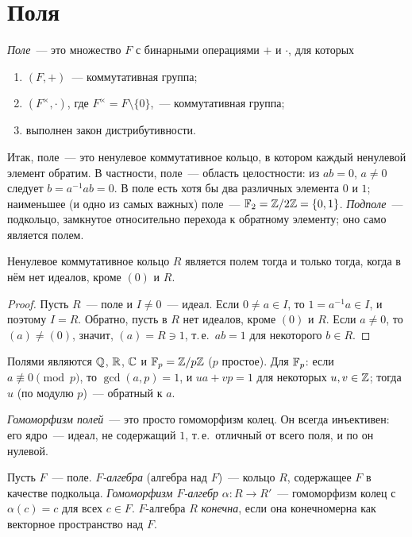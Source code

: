 \section{Поля}

\begin{definition}[1.1]
\emph{Поле}~--- это множество $F$ с бинарными операциями $+$ и $\cdot$, для которых
\begin{enumerate}[label=(\alph*)]
\item $(F,+)$~--- коммутативная группа;
\item $(F^\times,\cdot)$, где $F^\times=F\setminus\{0\}$,~--- коммутативная группа;
\item выполнен закон дистрибутивности.
\end{enumerate}
\end{definition}

Итак, поле~--- это ненулевое коммутативное кольцо, в котором каждый ненулевой элемент обратим. В частности, поле~---
область целостности: из $ab=0$, $a\ne0$ следует $b=a^{-1}ab=0$. В поле есть хотя бы два различных элемента $0$ и $1$;
наименьшее (и одно из самых важных) поле~--- $\mathbb F_2=\mathbb Z/2\mathbb Z=\{0,1\}$. \emph{Подполе}~--- подкольцо, замкнутое относительно
перехода к обратному элементу; оно само является полем.

\begin{lemma}[1.2]
Ненулевое коммутативное кольцо $R$ является полем тогда и только тогда, когда в нём нет идеалов, кроме $(0)$ и $R$.
\end{lemma}

\begin{proof}
Пусть $R$~--- поле и $I\ne0$~--- идеал. Если $0\ne a\in I$, то $1=a^{-1}a\in I$, и поэтому $I=R$. Обратно, пусть в $R$ нет
идеалов, кроме $(0)$ и $R$. Если $a\ne0$, то $(a)\ne(0)$, значит, $(a)=R\ni1$, т.\,е.\ $ab=1$ для некоторого $b\in R$.
\end{proof}

\begin{example}[1.3]
Полями являются $\mathbb Q$, $\mathbb R$, $\mathbb C$ и $\mathbb F_p=\mathbb Z/p\mathbb Z$ ($p$ простое). Для $\mathbb F_p$: если $a\not\equiv0\pmod p$, то
$\gcd(a,p)=1$, и $ua+vp=1$ для некоторых $u,v\in\mathbb Z$; тогда $u$ (по модулю $p$)~--- обратный к $a$.
\end{example}

\emph{Гомоморфизм полей}~--- это просто гомоморфизм колец. Он всегда инъективен: его ядро~--- идеал, не содержащий $1$,
т.\,е.\ отличный от всего поля, и по  он нулевой.

Пусть $F$~--- поле. \emph{$F$-алгебра} (алгебра над $F$)~--- кольцо $R$, содержащее $F$ в качестве подкольца.
\emph{Гомоморфизм $F$-алгебр} $\alpha\colon R\to R'$~--- гомоморфизм колец с $\alpha(c)=c$ для всех $c\in F$. $F$-алгебра $R$
\emph{конечна}, если она конечномерна как векторное пространство над $F$.


